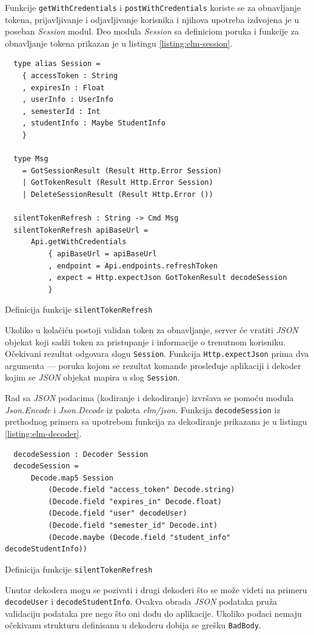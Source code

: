 \documentclass[12pt,oneside]{memoir}
\begin{document}
Funkcije \texttt{getWithCredentials} i \texttt{postWithCredentials} koriste se za obnavljanje tokena,
prijavljivanje i odjavljivanje korisnika i njihova upotreba izdvojena je u poseban \emph{Session} modul.
Deo modula \emph{Session} sa definiciom poruka i funkcije za obnavljanje tokena
prikazan je u listingu \ref{listing:elm-session}.
\begin{listing}[h]
\begin{verbatim}
  type alias Session =
    { accessToken : String
    , expiresIn : Float
    , userInfo : UserInfo
    , semesterId : Int
    , studentInfo : Maybe StudentInfo
    }

  type Msg
    = GotSessionResult (Result Http.Error Session)
    | GotTokenResult (Result Http.Error Session)
    | DeleteSessionResult (Result Http.Error ())

  silentTokenRefresh : String -> Cmd Msg
  silentTokenRefresh apiBaseUrl =
      Api.getWithCredentials
          { apiBaseUrl = apiBaseUrl
          , endpoint = Api.endpoints.refreshToken
          , expect = Http.expectJson GotTokenResult decodeSession
          }
\end{verbatim}
\caption{Definicija funkcije \texttt{silentTokenRefresh}}
\label{listing:elm-session}
\end{listing}
Ukoliko u kolačiću postoji validan token za obnavljanje, server će vratiti \emph{JSON} objekat koji sadži token za pristupanje i informacije o trenutnom korisniku.
Očekivani rezultat odgovara slogu \texttt{Session}. Funkcija \texttt{Http.expectJson} prima dva argumenta --- poruka kojom se rezultat komande prosleđuje aplikaciji
i dekoder kojim se \emph{JSON} objekat mapira u slog \texttt{Session}. 

Rad sa \emph{JSON} podacima (kodiranje i dekodiranje) izvršava se pomoću modula \emph{Json.Encode} i \emph{Json.Decode} iz paketa \emph{elm/json}.
Funkcija \texttt{decodeSession} iz prethodnog primera sa upotrebom funkcija za dekodiranje prikazana je u listingu \ref{listing:elm-decoder}.
\begin{listing}[h]
\begin{verbatim}
  decodeSession : Decoder Session
  decodeSession =
      Decode.map5 Session
          (Decode.field "access_token" Decode.string)
          (Decode.field "expires_in" Decode.float)
          (Decode.field "user" decodeUser)
          (Decode.field "semester_id" Decode.int)
          (Decode.maybe (Decode.field "student_info" decodeStudentInfo))
\end{verbatim}
\caption{Definicija funkcije \texttt{silentTokenRefresh}}
\label{listing:elm-decoder}
\end{listing}
Unutar dekodera mogu se pozivati i drugi dekoderi što se može videti na primeru \texttt{decodeUser} i \texttt{decodeStudentInfo}.
Ovakva obrada \emph{JSON} podataka pruža validaciju podataka pre nego što oni dođu do aplikacije. Ukoliko podaci nemaju očekivanu strukturu
definisanu u dekoderu dobija se grešku \texttt{BadBody}.
\end{document}
